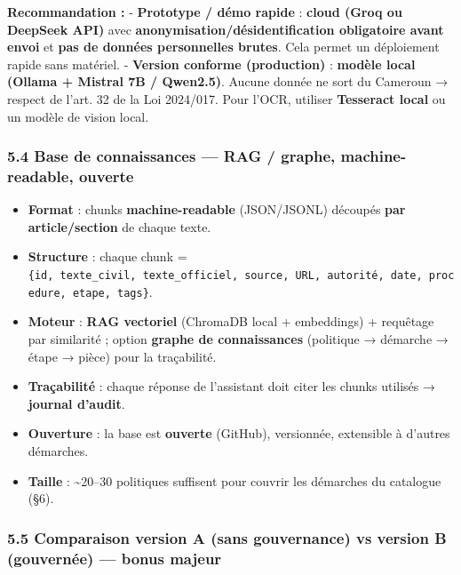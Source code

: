 \documentclass[
]{article}
\providecommand{\tightlist}{%
  \setlength{\itemsep}{0pt}\setlength{\parskip}{0pt}}
\begin{document}
\textbf{Recommandation :} - \textbf{Prototype / démo rapide} :
\textbf{cloud (Groq ou DeepSeek API)} avec
\textbf{anonymisation/désidentification obligatoire avant envoi} et
\textbf{pas de données personnelles brutes}. Cela permet un déploiement
rapide sans matériel. - \textbf{Version conforme (production)} :
\textbf{modèle local (Ollama + Mistral 7B / Qwen2.5)}. Aucune donnée ne
sort du Cameroun → respect de l'art. 32 de la Loi 2024/017. Pour l'OCR,
utiliser \textbf{Tesseract local} ou un modèle de vision local.

\subsubsection{5.4 Base de connaissances --- RAG / graphe,
machine-readable,
ouverte}\label{base-de-connaissances-rag-graphe-machine-readable-ouverte}

\begin{itemize}
\tightlist
\item
  \textbf{Format} : chunks \textbf{machine-readable} (JSON/JSONL)
  découpés \textbf{par article/section} de chaque texte.
\item
  \textbf{Structure} : chaque chunk =
  \texttt{\{id,\ texte\_civil,\ texte\_officiel,\ source,\ URL,\ autorité,\ date,\ procedure,\ etape,\ tags\}}.
\item
  \textbf{Moteur} : \textbf{RAG vectoriel} (ChromaDB local + embeddings)
  + requêtage par similarité ; option \textbf{graphe de connaissances}
  (politique → démarche → étape → pièce) pour la traçabilité.
\item
  \textbf{Traçabilité} : chaque réponse de l'assistant doit citer les
  chunks utilisés → \textbf{journal d'audit}.
\item
  \textbf{Ouverture} : la base est \textbf{ouverte} (GitHub),
  versionnée, extensible à d'autres démarches.
\item
  \textbf{Taille} : \textasciitilde20--30 politiques suffisent pour
  couvrir les démarches du catalogue (§6).
\end{itemize}

\subsubsection{5.5 Comparaison version A (sans gouvernance) vs version B
(gouvernée) --- bonus
majeur}\label{comparaison-version-a-sans-gouvernance-vs-version-b-gouvernuxe9e-bonus-majeur}
\end{document}
